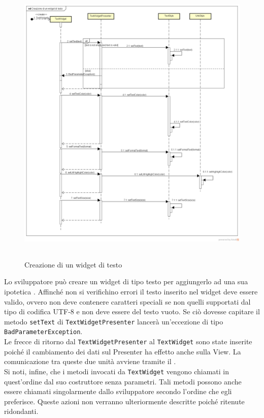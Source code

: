\label{Creazione di un widget di testo}
\begin{figure}[ht]
	\centering
	\includegraphics[width=16cm, height=14cm]{Sezioni/Diagrammi/img/Creazione di un widget di testo.png}
	\caption{Creazione di un widget di testo}
\end{figure}

Lo sviluppatore può creare un widget di tipo testo per aggiungerlo ad una sua ipotetica . Affinché non si verifichino errori il testo inserito nel widget deve essere valido, ovvero non deve contenere caratteri speciali se non quelli supportati dal tipo di codifica UTF-8 e non deve essere del testo vuoto. Se ciò dovesse capitare il metodo \texttt{setText} di \texttt{TextWidgetPresenter} lancerà un'eccezione di tipo \texttt{BadParameterException}. \\
Le frecce di ritorno dal \texttt{TextWidgetPresenter}  al \texttt{TextWidget} sono state inserite poiché il cambiamento dei dati sul Presenter ha effetto anche sulla View. La comunicazione tra queste due unità avviene tramite il  . \\
Si noti, infine, che i metodi invocati da \texttt{TextWidget} vengono chiamati in quest'ordine dal suo costruttore senza parametri. Tali metodi possono anche essere chiamati singolarmente dallo sviluppatore secondo l'ordine che egli preferisce. Queste azioni non verranno ulteriormente descritte poiché ritenute ridondanti.

